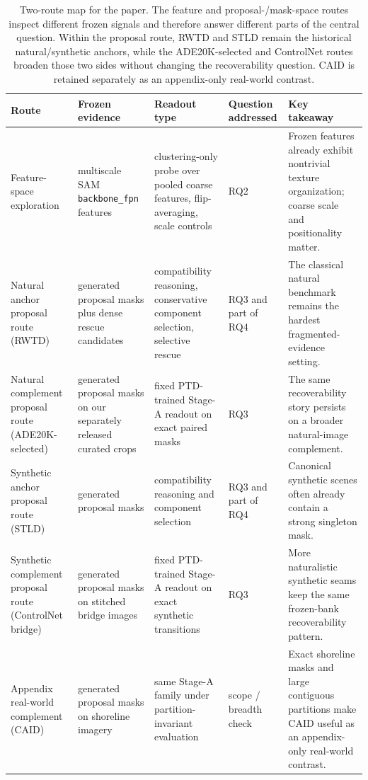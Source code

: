 \begin{table}[t]
\centering
\scriptsize
\setlength{\tabcolsep}{4pt}
\renewcommand{\arraystretch}{0.98}
\begin{tabularx}{\textwidth}{@{}p{}p{}p{}p{}X@{}}
\toprule
Route & Frozen evidence & Readout type & Question addressed & Key takeaway \\
\midrule
Feature-space exploration & multiscale SAM \texttt{backbone\_fpn} features & clustering-only probe over pooled coarse features, flip-averaging, scale controls & RQ2 & Frozen features already exhibit nontrivial texture organization; coarse scale and positionality matter. \\
Natural anchor proposal route (RWTD) & generated proposal masks plus dense rescue candidates & compatibility reasoning, conservative component selection, selective rescue & RQ3 and part of RQ4 & The classical natural benchmark remains the hardest fragmented-evidence setting. \\
Natural complement proposal route (ADE20K-selected) & generated proposal masks on our separately released curated crops & fixed PTD-trained Stage-A readout on exact paired masks & RQ3 & The same recoverability story persists on a broader natural-image complement. \\
Synthetic anchor proposal route (STLD) & generated proposal masks & compatibility reasoning and component selection & RQ3 and part of RQ4 & Canonical synthetic scenes often already contain a strong singleton mask. \\
Synthetic complement proposal route (ControlNet bridge) & generated proposal masks on stitched bridge images & fixed PTD-trained Stage-A readout on exact synthetic transitions & RQ3 & More naturalistic synthetic seams keep the same frozen-bank recoverability pattern. \\
Appendix real-world complement (CAID) & generated proposal masks on shoreline imagery & same Stage-A family under partition-invariant evaluation & scope / breadth check & Exact shoreline masks and large contiguous partitions make CAID useful as an appendix-only real-world contrast. \\
\bottomrule
\end{tabularx}
\caption{Two-route map for the paper. The feature and proposal-/mask-space routes inspect different frozen signals and therefore answer different parts of the central question. Within the proposal route, RWTD and STLD remain the historical natural/synthetic anchors, while the ADE20K-selected and ControlNet routes broaden those two sides without changing the recoverability question. CAID is retained separately as an appendix-only real-world contrast.}
\label{tab:route_protocol}
\end{table}
